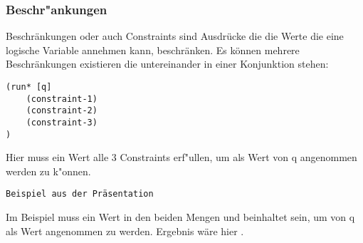 \subsubsection{Beschr"ankungen}

Beschränkungen oder auch Constraints sind Ausdrücke die die Werte die eine logische Variable annehmen kann, beschränken. Es können mehrere Beschränkungen existieren die untereinander in einer Konjunktion stehen:
\begin{lstlisting}
(run* [q]
    (constraint-1)
    (constraint-2)
    (constraint-3)
)
\end{lstlisting}

Hier muss ein Wert alle 3 Constraints erf"ullen, um als Wert von q angenommen werden zu k"onnen.
\begin{lstlisting}
Beispiel aus der Präsentation
\end{lstlisting}

Im Beispiel muss ein Wert in den beiden Mengen \code{[1 2 3]} und \code{[2 3 4]} beinhaltet sein, um von q als Wert angenommen zu werden. Ergebnis wäre hier \code{[2 3]}.

